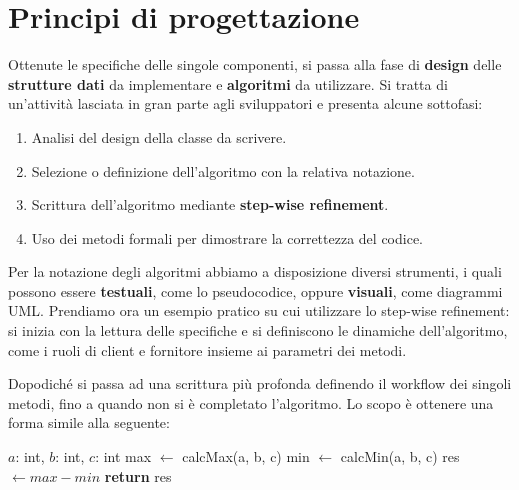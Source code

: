 %

\section{Principi di progettazione}
Ottenute le specifiche delle singole componenti, si passa alla fase di \textbf{design} delle \textbf{strutture dati} da implementare e \textbf{algoritmi} da utilizzare. Si tratta di un'attività lasciata in gran parte agli sviluppatori e presenta alcune sottofasi: \begin{enumerate}
	\item Analisi del design della classe da scrivere.
	\item Selezione o definizione dell'algoritmo con la relativa notazione.
	\item Scrittura dell'algoritmo mediante \textbf{step-wise refinement}.
	\item Uso dei metodi formali per dimostrare la correttezza del codice.
\end{enumerate}
\noindent Per la notazione degli algoritmi abbiamo a disposizione diversi strumenti, i quali possono essere \textbf{testuali}, come lo pseudocodice, oppure \textbf{visuali}, come diagrammi UML. Prendiamo ora un esempio pratico su cui utilizzare lo step-wise refinement: si inizia con la lettura delle specifiche e si definiscono le dinamiche dell'algoritmo, come i ruoli di client e fornitore insieme ai parametri dei metodi.\par
Dopodiché si passa ad una scrittura più profonda definendo il workflow dei singoli metodi, fino a quando non si è completato l'algoritmo. Lo scopo è ottenere una forma simile alla seguente: \begin{algorithm}[h]
	\caption{getMax(a, b, c)}
	\begin{algorithmic}[i]
		\Require $a$: int, $b$: int, $c$: int
		\State max $\gets$ calcMax(a, b, c)
		\State min $\gets$ calcMin(a, b, c)
		\State res $\gets max-min$
		\State \textbf{return} res
	\end{algorithmic}
\end{algorithm}


